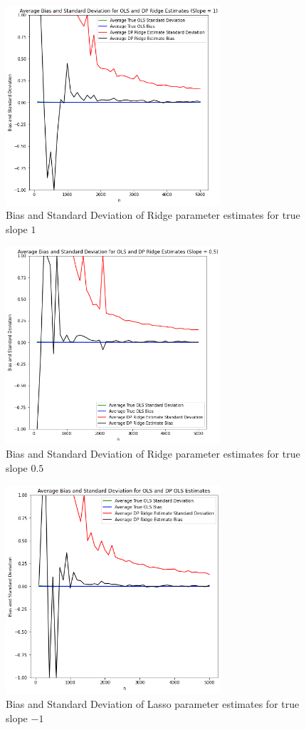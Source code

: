 \documentclass[11pt,conference]{IEEEtran}
\begin{document}
\begin{figure}[htbp]
\centerline{\includegraphics[width=8.0cm]{plots/ridge_1.png}}
\caption{Bias and Standard Deviation of Ridge parameter estimates for true slope $1$}
\label{fig}
\end{figure}
\begin{figure}[htbp]
\centerline{\includegraphics[width=8.0cm]{plots/ridge_0.5.png}}
\caption{Bias and Standard Deviation of Ridge parameter estimates for true slope $0.5$}
\label{fig}
\end{figure}
\begin{figure}[htbp]
\centerline{\includegraphics[width=8.0cm]{plots/ridge_-1.png}}
\caption{Bias and Standard Deviation of Lasso parameter estimates for true slope $-1$}
\label{fig}
\end{figure}
\end{document}
